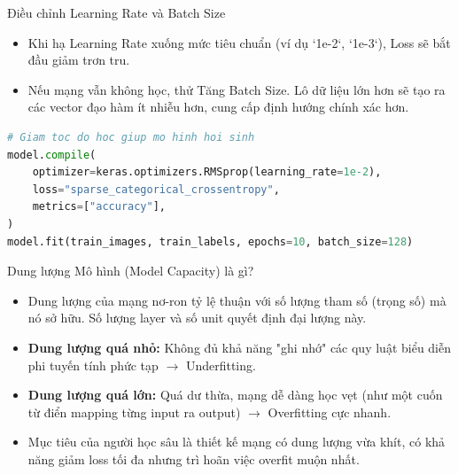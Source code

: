 \documentclass[aspectratio=169]{beamer}
\begin{document}
\begin{frame}[fragile]{Điều chỉnh Learning Rate và Batch Size}
    \begin{itemize}
        \item Khi hạ Learning Rate xuống mức tiêu chuẩn (ví dụ `1e-2`, `1e-3`), Loss sẽ bắt đầu giảm trơn tru.
        \item Nếu mạng vẫn không học, thử Tăng Batch Size. Lô dữ liệu lớn hơn sẽ tạo ra các vector đạo hàm ít nhiễu hơn, cung cấp định hướng chính xác hơn.
    \end{itemize}
\begin{lstlisting}[language=Python]
# Giam toc do hoc giup mo hinh hoi sinh
model.compile(
    optimizer=keras.optimizers.RMSprop(learning_rate=1e-2),
    loss="sparse_categorical_crossentropy",
    metrics=["accuracy"],
)
model.fit(train_images, train_labels, epochs=10, batch_size=128)
\end{lstlisting}
\end{frame}

\begin{frame}{Dung lượng Mô hình (Model Capacity) là gì?}
    \begin{itemize}
        \item Dung lượng của mạng nơ-ron tỷ lệ thuận với số lượng tham số (trọng số) mà nó sở hữu. Số lượng layer và số unit quyết định đại lượng này.
        \item \textbf{Dung lượng quá nhỏ:} Không đủ khả năng "ghi nhớ" các quy luật biểu diễn phi tuyến tính phức tạp $\rightarrow$ Underfitting.
        \item \textbf{Dung lượng quá lớn:} Quá dư thừa, mạng dễ dàng học vẹt (như một cuốn từ điển mapping từng input ra output) $\rightarrow$ Overfitting cực nhanh.
        \item Mục tiêu của người học sâu là thiết kế mạng có dung lượng vừa khít, có khả năng giảm loss tối đa nhưng trì hoãn việc overfit muộn nhất.
    \end{itemize}
\end{frame}
\end{document}
